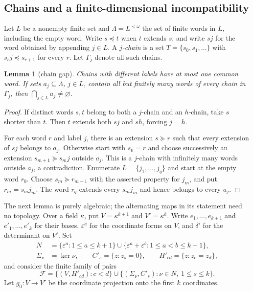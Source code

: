 \documentclass[11pt]{amsart}
\newtheorem{lemma}[theorem]{Lemma}
\theoremstyle{definition}
\theoremstyle{remark}
\numberwithin{equation}{section}
\theoremstyle{plain}
\theoremstyle{definition}
\theoremstyle{plain}
\begin{document}
\subsection{Chains and a finite-dimensional incompatibility}

Let $L$ be a nonempty finite set and $\Lambda=L^{<\omega}$ the set of finite words in $L$, including the
empty word. Write $s\preceq t$ when $t$ extends $s$, and write $sj$ for the word obtained by appending
$j\in L$. A \emph{$j$-chain} is a set $T=\{s_0,s_1,\dots\}$ with $s_rj\preceq s_{r+1}$ for every $r$.
Let $\Gamma_j$ denote all such chains.

\begin{lemma}[chain gap]\label{scalar:gap}
Chains with different labels have at most one common word. If sets $a_j\subseteq\Lambda$, $j\in L$,
contain all but finitely many words of every chain in $\Gamma_j$, then $\bigcap_{j\in L}a_j\ne\varnothing$.
\end{lemma}

\begin{proof}
If distinct words $s,t$ belong to both a $j$-chain and an $h$-chain, take $s$ shorter than $t$.
Then $t$ extends both $sj$ and $sh$, forcing $j=h$.

For each word $r$ and label $j$, there is an extension $s\succeq r$ such that every extension of $sj$
belongs to $a_j$. Otherwise start with $s_0=r$ and choose successively an extension
$s_{m+1}\succeq s_mj$ outside $a_j$. This is a $j$-chain with infinitely many words outside $a_j$,
a contradiction. Enumerate $L=\{j_1,\dots,j_q\}$ and start at the empty word $r_0$. Choose $s_m\succeq
r_{m-1}$ with the asserted property for $j_m$, and put $r_m=s_mj_m$. The word $r_q$ extends every
$s_mj_m$ and hence belongs to every $a_j$.
\end{proof}

The next lemma is purely algebraic; the alternating maps in its statement need no topology.
Over a field $\kappa$, put $V=\kappa^{k+1}$ and $V'=\kappa^k$. Write $e_1,\dots,e_{k+1}$ and
$e'_1,\dots,e'_k$ for their bases, $\varepsilon^a$ for the coordinate forms on $V$, and $\delta'$ for the
determinant on $V'$. Set
\begin{align*}
 N&=\{\varepsilon^a:1\le a\le k+1\}
       \cup\{\varepsilon^a+\varepsilon^b:1\le a<b\le k+1\},\\
 \Sigma_\nu&=\ker\nu,\qquad C'_s=\{z:z_s=0\},\qquad H'_{cd}=\{z:z_c=z_d\},
\end{align*}
and consider the finite family of pairs
\begin{equation}\label{scalar:family}
 \mathcal F=\{(V,H'_{cd}):c<d\}
 \cup\{(\Sigma_\nu,C'_s):\nu\in N,\ 1\le s\le k\}.
\end{equation}
Let $g_0\colon V\to V'$ be the coordinate projection onto the first $k$ coordinates.
\end{document}
